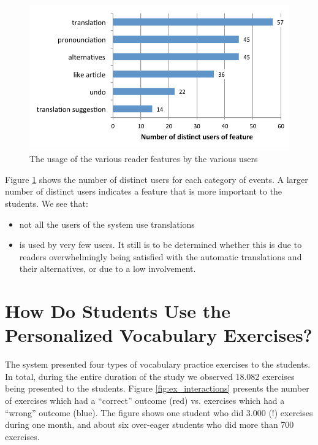   \begin{figure}[h!]
  \centering
    \includegraphics[width=0.9\columnwidth]{figures/reader_feature_usage_per_user}
    \caption{The usage of the various reader features by the various users }
    \label{fig:usage_per_user}
  \end{figure}


Figure \ref{fig:usage_per_user} shows the number of distinct users for each category of events. A larger number of distinct users indicates a feature that is more important to the students. We see that: 
\begin{itemize}
  \item not all the users of the system use translations
  \item {} is used by very few users. It still is to be determined whether this is due to readers overwhelmingly being satisfied with the automatic translations and their alternatives, or due to a low involvement. 
\end{itemize}



\newpage
\section{How Do Students Use the Personalized Vocabulary Exercises?}

The system presented four types of vocabulary practice exercises to the students. In total, during the entire duration of the study we observed 18.082 exercises being presented to the students. Figure \ref{fig:ex_interactions} presents the number of exercises which had a ``correct'' outcome (red) vs. exercises which had a ``wrong'' outcome (blue). The figure shows one student who did 3.000 (!) exercises during one month, and about six over-eager students who did more than 700 exercises. 

